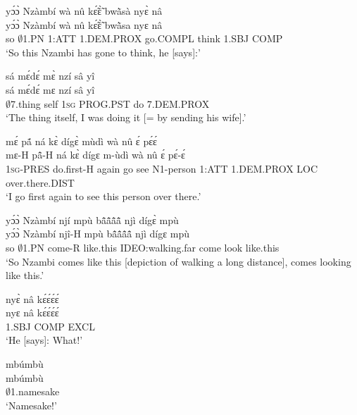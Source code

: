 \begin{exe} 
\exN\label{111}
  \glll yɔ́ɔ̀ Nzàmbí wà nû kɛ̃́ɛ̃̀ bwã̀sà nyɛ̀ nâ \\
         yɔ́ɔ̀ Nzàmbí wà nû kɛ̃́ɛ̃̀ bwã̀sa nyɛ nâ \\
       so $\emptyset$1.PN 1:ATT 1.DEM.PROX go.COMPL think 1.SBJ COMP  \\
    \trans `So this Nzambi has gone to think, he [says]:'
\end{exe}

\begin{exe} 
\exN\label{112}
  \glll sá mɛ́dɛ́ mɛ̀ nzí sâ yî \\
        sá mɛ́dɛ́ mɛ nzí sâ yî \\
        $\emptyset$7.thing self 1\textsc{sg} PROG.PST do 7.DEM.PROX \\
    \trans `The thing itself, I was doing it [= by sending his wife].'
\end{exe}

\begin{exe} 
\exN\label{113}
  \glll mɛ́ pã́ ná kɛ̀ dígɛ̀ mùdì wà nû ɛ́ pɛ́ɛ́ \\
        mɛ-H pã̂-H ná kɛ̀ dígɛ m-ùdì wà nû ɛ́ pɛ́-ɛ́ \\
        1\textsc{sg}-PRES do.first-H again go see N1-person 1:ATT 1.DEM.PROX LOC over.there.DIST \\
    \trans `I go first again to see this person over there.'
\end{exe}

\begin{exe} 
\exN\label{114}
  \glll yɔ́ɔ̀ Nzàmbí njí mpù bã̂ã̂ã̂ã̂ njì dígɛ̀ mpù \\
        yɔ́ɔ̀ Nzàmbí njî-H mpù bã̂ã̂ã̂ã̂ njì dígɛ mpù \\
        so $\emptyset$1.PN come-R like.this IDEO:walking.far come look like.this \\
    \trans `So Nzambi comes like this [depiction of walking a long distance], comes looking like this.'
\end{exe}

\begin{exe} 
\exN\label{115}
  \glll nyɛ̀ nâ kɛ́ɛ́ɛ́ɛ́ \\
        nyɛ nâ kɛ́ɛ́ɛ́ɛ́ \\
       1.SBJ COMP EXCL  \\
    \trans `He [says]: What!'
\end{exe}

\begin{exe} 
\exN\label{116}
  \glll mbúmbù \\
       mbúmbù \\
        $\emptyset$1.namesake \\
    \trans `Namesake!'
\end{exe}

